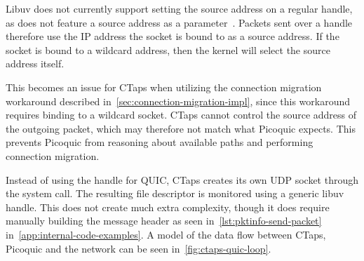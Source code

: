 Libuv does not currently
support setting the source address on a regular  handle,
as  does not feature a source address as a parameter~\cite{libuv_udp_send}.
Packets sent over a  handle therefore use the
IP address the socket is bound to as a source address.
If the socket is bound to a wildcard address, then the kernel will
select the source address itself.

This becomes an issue for CTaps when utilizing the connection migration
workaround described in~\cref{sec:connection-migration-impl},
since this workaround requires binding to a wildcard socket.
CTaps cannot control the source address of the outgoing packet,
which may therefore not match what Picoquic expects.
This prevents Picoquic from reasoning about available paths and performing connection migration.

Instead of using the  handle for QUIC, CTaps creates
its own UDP socket through the  system call.
The resulting file descriptor is monitored using a generic
 libuv handle. This does not create much extra
complexity, though it does require manually building the message header
as seen in~\cref{lst:pktinfo-send-packet} in~\cref{app:internal-code-examples}.
A model of the data flow between CTaps, Picoquic and the network can be
seen in~\cref{fig:ctaps-quic-loop}.

